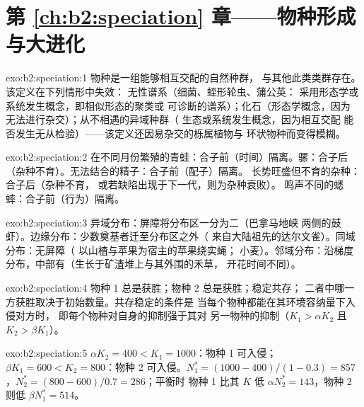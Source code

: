 \section*{第 \ref{ch:b2:speciation} 章——物种形成与大进化}

\begin{solution}{exo:b2:speciation:1}
物种是一组能够相互交配的自然种群，
与其他此类类群存在。该定义在下列情形中失效：
无性谱系（细菌、蛭形轮虫、蒲公英：
采用形态学或系统发生概念，即相似形态的聚类或
可诊断的谱系）；化石（形态学概念，因为
无法进行杂交）；从不相遇的异域种群（
生态或系统发生概念，因为相互交配
能否发生无从检验）——该定义还因易杂交的栎属植物与
环状物种而变得模糊。
\end{solution}

\begin{solution}{exo:b2:speciation:2}
在不同月份繁殖的青蛙：合子前（时间）隔离。骡：合子后
（杂种不育）。无法结合的精子：合子前（配子）隔离。
长势旺盛但不育的杂种：合子后（杂种不育，
或若缺陷出现于下一代，则为杂种衰败）。
鸣声不同的蟋蟀：合子前（行为）隔离。
\end{solution}

\begin{solution}{exo:b2:speciation:3}
异域分布：屏障将分布区一分为二（巴拿马地峡
两侧的鼓虾）。边缘分布：少数奠基者迁至分布区之外（
来自大陆祖先的达尔文雀）。同域分布：无屏障（
以山楂与苹果为宿主的苹果绕实蝇；
小麦）。邻域分布：沿梯度分布，中部有（生长于矿渣堆上与其外围的禾草，
开花时间不同）。
\end{solution}

\begin{solution}{exo:b2:speciation:4}
物种 1 总是获胜；物种 2 总是获胜；稳定共存；
二者中哪一方获胜取决于初始数量。共存稳定的条件是
当每个物种都能在其环境容纳量下入侵对方时，
即每个物种对自身的抑制强于其对
另一物种的抑制（$K_1 > \alpha K_2$ 且 $K_2 > \beta K_1$）。
\end{solution}

\begin{solution}{exo:b2:speciation:5}
$\alpha K_2 = 400 < K_1 = 1000$：物种 1 可入侵；$\beta K_1 = 600
< K_2 = 800$：物种 2 可入侵。$N_1^{*} = (1000 - 400)/(1 - 0.3) =
857$，$N_2^{*} = (800 - 600)/0.7 = 286$；平衡时
物种 1 比其 $K$ 低 $\alpha N_2^{*} = 143$，物种 2 则低 $\beta
N_1^{*} = 514$。
\end{solution}

